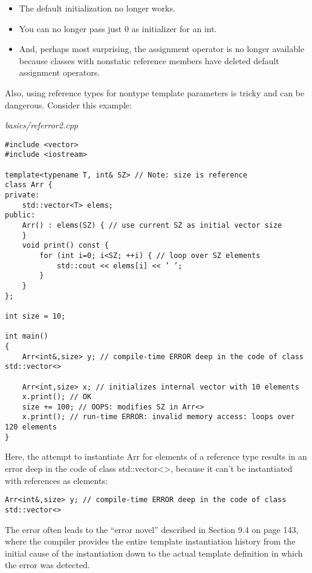\begin{itemize}
\item 
The default initialization no longer works.

\item 
You can no longer pass just 0 as initializer for an int.

\item 
And, perhaps most surprising, the assignment operator is no longer available because classes with nonstatic reference members have deleted default assignment operators.
\end{itemize}

Also, using reference types for nontype template parameters is tricky and can be dangerous. Consider this example:

\noindent
\textit{basics/referror2.cpp}
\begin{lstlisting}[style=styleCXX]
#include <vector>
#include <iostream>

template<typename T, int& SZ> // Note: size is reference
class Arr {
private:
	std::vector<T> elems;
public:
	Arr() : elems(SZ) { // use current SZ as initial vector size
	}
	void print() const {
		for (int i=0; i<SZ; ++i) { // loop over SZ elements
			std::cout << elems[i] << ’ ’;
		}
	}
};

int size = 10;

int main()
{
	Arr<int&,size> y; // compile-time ERROR deep in the code of class std::vector<>
	
	Arr<int,size> x; // initializes internal vector with 10 elements
	x.print(); // OK
	size += 100; // OOPS: modifies SZ in Arr<>
	x.print(); // run-time ERROR: invalid memory access: loops over 120 elements
}
\end{lstlisting}

Here, the attempt to instantiate Arr for elements of a reference type results in an error deep in the code of class std::vector<>, because it can’t be instantiated with references as elements:

\begin{lstlisting}[style=styleCXX]
Arr<int&,size> y; // compile-time ERROR deep in the code of class std::vector<>
\end{lstlisting}

The error often leads to the “error novel” described in Section 9.4 on page 143, where the compiler provides the entire template instantiation history from the initial cause of the instantiation down to the actual template definition in which the error was detected.

